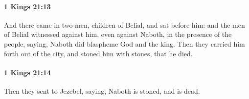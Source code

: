 		\paragraph{1 Kings 21:13} %
			\label{1KINGS-21-13}

			And there came in two men, children of Belial, and sat before him: and the men of Belial witnessed against him, even against Naboth, in the presence of the people, saying, Naboth did blaspheme God and the king. Then they carried him forth out of the city, and stoned him with stones, that he died.


		\paragraph{1 Kings 21:14} %
			\label{1KINGS-21-14}

			Then they sent to Jezebel, saying, Naboth is stoned, and is dead.


